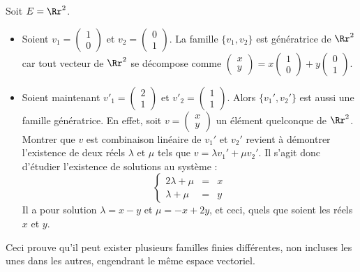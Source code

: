 \documentclass[class=report,crop=false]{standalone}
\begin{document}
\begin{exemple}
Soit $E=\Rr^2$.
\begin{itemize}
  \item Soient $v_1=\left(\begin{smallmatrix}1\\0\end{smallmatrix}\right)$ et
  $v_2=\left(\begin{smallmatrix}0\\1\end{smallmatrix}\right)$.
  La famille $\{v_1,v_2\}$ est génératrice de $\Rr^2$ car
  tout vecteur de $\Rr^2$ se décompose comme
  $\left(\begin{smallmatrix}x\\y\end{smallmatrix}\right)=
  x\left(\begin{smallmatrix}1\\0\end{smallmatrix}\right)
  +y\left(\begin{smallmatrix}0\\1\end{smallmatrix}\right)$.

  \item Soient maintenant $v'_1=\left(\begin{smallmatrix}2\\1\end{smallmatrix}\right)$
et $v'_2 = \left(\begin{smallmatrix}1\\1\end{smallmatrix}\right)$. Alors
  $\{v_1',v_2'\}$ est aussi une famille génératrice.
  En effet, soit  $v=\left(\begin{smallmatrix}x\\y\end{smallmatrix}\right)$ un élément quelconque de $\Rr^2$.
  Montrer que $v$ est combinaison linéaire de $v_1'$ et $v_2'$
  revient à démontrer l'existence de deux réels  $\lambda$ et $\mu$  tels que
$v=\lambda v_1' +\mu v_2'$.
Il s'agit donc d'étudier l'existence de solutions au système :
$$\left \{ \begin{array}{rcl}
2\lambda + \mu &=& x\\
\lambda+\mu &=& y
\end{array}\right .$$
Il a pour solution $\lambda =x -y$ et $\mu =-x+2y$,
et ceci, quels que soient les réels $x$ et $y$.
\end{itemize}
Ceci prouve qu'il peut exister plusieurs familles finies différentes,
non incluses les unes dans les autres, engendrant le même espace vectoriel.
\end{exemple}
\end{document}
